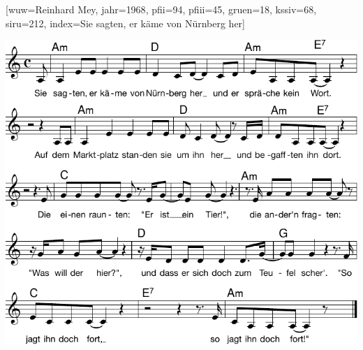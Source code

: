 [wuw={Reinhard Mey}, jahr={1968}, pfii={94}, pfiii={45}, gruen={18}, kssiv={68}, siru={212}, index={Sie sagten, er käme von Nürnberg her}]

\beginverse
\endverse
\centering\includegraphics[width=1\textwidth]{Noten/Lied059.pdf}	

